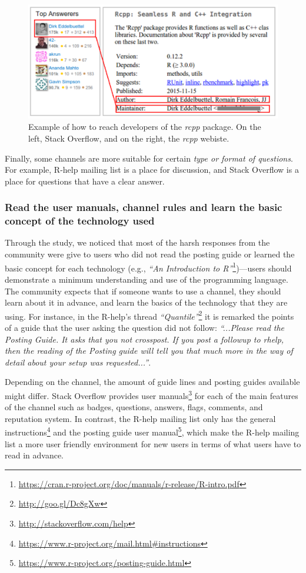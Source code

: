 \documentclass{sig-alternate-05-2015}
\begin{document}
		\begin{figure} [!htb]
			\centering
			\includegraphics[width=\columnwidth]{Figures/CCchannel}
			\caption{Example of how to reach developers of the \emph{rcpp} package. On the left, Stack Overflow, and on the right, the \emph{rcpp} webiste.}
			\label{fig:CCchannel}
		\end{figure}

		Finally, some channels are more suitable for certain \emph{type or format of questions}. 
		For example, R-help mailing list is a place for discussion, and Stack Overflow is a place for questions that have a clear answer.


	\subsubsection{Read the user manuals, channel rules and learn the basic concept of the technology used}

		Through the study, we noticed that most of the harsh responses from the community were give to users who did not read the posting guide or learned the basic concept for each technology (e.g., \textit{``An Introduction to R''}\footnote{\url{https://cran.r-project.org/doc/manuals/r-release/R-intro.pdf}})---users should demonstrate a minimum understanding and use of the programming language.
		The community expects that if someone wants to use a channel, they should learn about it in advance, and learn the basics of the technology that they are using.
		For instance, in the R-help's thread \textit{``Quantile''}\footnote{\url{http://goo.gl/Dc8gXw}} it is remarked the points of a guide that the user asking the question did not follow: \textit{``...Please read the Posting Guide. It asks that you not crosspost. If you post a followup to rhelp, then the reading of the Posting guide will tell you that much more in the way of detail about your setup was requested...''}.

		Depending on the channel, the amount of guide lines and posting guides available might differ. 
		Stack Overflow provides user manuals\footnote{\url{http://stackoverflow.com/help}} for each of the main features of the channel such as badges, questions, answers, flags, comments, and reputation system.
		In contrast, the R-help mailing list only has the general instructions\footnote{\url{https://www.r-project.org/mail.html\#instructions}} and the posting guide user manual\footnote{\url{https://www.r-project.org/posting-guide.html}}, which make the R-help mailing list a more user friendly environment for new users in terms of what users have to read in advance.
\end{document}
